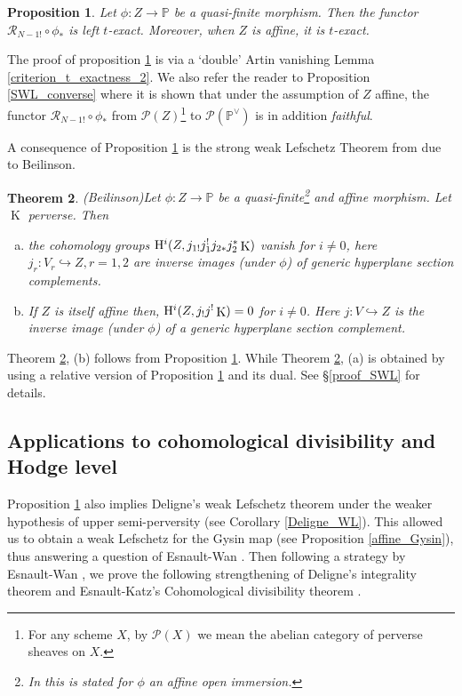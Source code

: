 \documentclass[12pt, reqno]{amsart}
\theoremstyle{plain}
\newtheorem{thm}{\bf Theorem}[subsection]
\newtheorem{prop}[thm]{\bf Proposition}
\theoremstyle{definition}
\theoremstyle{definition}
\newcommand{\bbP}{{\mathbb P}}
\newcommand{\cP}{{\mathcal P}}
\newcommand{\cR}{{\mathcal R}}
\newcommand{\rH}{{\rm H}}
\DeclareMathOperator{\KK}{K}
\begin{document}
\begin{prop}\label{Cor_R_!_Intro}
    Let $\phi \colon Z \to \bbP$ be a quasi-finite morphism. Then the functor $\cR_{N-1!} \circ \phi_*$ is left $t$-exact. Moreover, when $Z$ is affine, it is $t$-exact.
\end{prop}


The proof of proposition \ref{Cor_R_!_Intro} is via a `double' Artin vanishing Lemma \ref{criterion_t_exactness_2}. We also refer the reader to Proposition \ref{SWL_converse} where it is shown that under the assumption of $Z$ affine, the functor $\cR_{N-1!} \circ \phi_*$  from $\cP(Z)$\footnote{For any scheme $X$, by $\cP(X)$ we mean the abelian category of perverse sheaves on $X$.} to $\cP(\bbP^{\vee})$ is in addition \textit{faithful}.

A consequence of Proposition \ref{Cor_R_!_Intro} is the strong weak Lefschetz Theorem from \cite{deCM10} due to Beilinson. 

\begin{thm}(Beilinson)\label{SWL_Intro}
Let $\phi: Z \to \bbP$ be a quasi-finite\footnote{In \cite{deCM10} this is stated for $\phi$ an affine open immersion.} and affine morphism. Let $\KK$ perverse. Then 
 \begin{enumerate}[(b)]
     \item the cohomology groups $\rH^{i}(Z,j_{1!}j_{1}^{!}j_{2*}j_{2}^*\KK)$ vanish for $i \neq 0$, here $j_{r} \colon V_r \hookrightarrow Z,r=1,2$ are inverse images (under $\phi$) of generic hyperplane section complements.
     \item If $Z$ is itself affine then, $\rH^i(Z,j_{!}j^!\KK)=0$ for $i \neq 0$. Here $j \colon V \hookrightarrow Z$ is the inverse image (under $\phi$) of a generic hyperplane section complement.
 \end{enumerate}
   
\end{thm}

Theorem \ref{SWL_Intro}, (b) follows from Proposition \ref{Cor_R_!_Intro}. While Theorem \ref{SWL_Intro}, (a) is obtained by using a relative version of Proposition \ref{Cor_R_!_Intro} and its dual. See \S \ref{proof_SWL} for details.


\subsection{Applications to cohomological divisibility and Hodge level}Proposition \ref{Cor_R_!_Intro} also implies Deligne's weak Lefschetz theorem \cite[Corollary A.5]{Kat93} under the weaker hypothesis of upper semi-perversity (see Corollary \ref{Deligne_WL}).
This allowed us to obtain a weak Lefschetz for the Gysin map (see Proposition \ref{affine_Gysin}), thus answering a question of Esnault-Wan \cite{EW22}. Then following a strategy by Esnault-Wan \cite{EW22}, we prove the following strengthening of Deligne's integrality theorem and Esnault-Katz's Cohomological divisibility theorem \cite[Theorem 2.3, (2)]{EK05}. 
\end{document}
